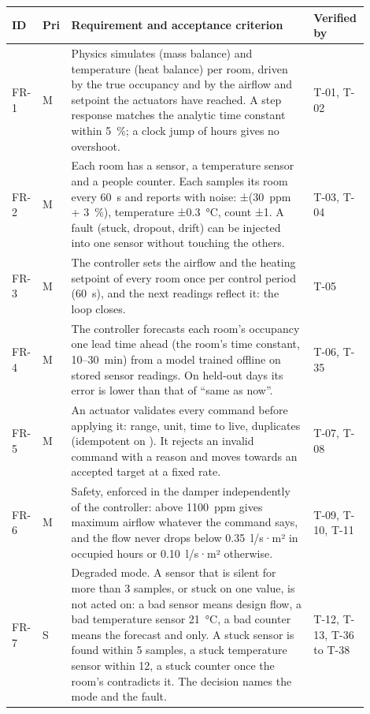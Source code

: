 \begin{longtable}[]{@{}L{0.07\linewidth}L{0.04\linewidth}L{0.66\linewidth}L{0.13\linewidth}@{}}
\toprule
\textbf{ID} & \textbf{Pri} & \textbf{Requirement and acceptance criterion} & \textbf{Verified by} \\
\midrule
\endhead
FR-1 & M & Physics simulates \COtwo{} (mass balance) and temperature (heat
balance) per room, driven by the true occupancy and by the airflow and setpoint
the actuators have reached. A step response matches the analytic time constant
within 5~\%; a clock jump of hours gives no overshoot. & T-01, T-02 \\
FR-2 & M & Each room has a \COtwo{} sensor, a temperature sensor and a people
counter. Each samples its room every 60~s and reports with noise: \COtwo{}
±(30~ppm + 3~\%), temperature ±0.3~°C, count ±1. A fault (stuck, dropout,
drift) can be injected into one sensor without touching the others. & T-03, T-04 \\
FR-3 & M & The controller sets the airflow and the heating setpoint of every
room once per control period (60~s), and the next readings reflect it: the loop
closes. & T-05 \\
FR-4 & M & The controller forecasts each room's occupancy one lead time ahead
(the room's \COtwo{} time constant, 10--30~min) from a model trained offline on
stored sensor readings. On held-out days its error is lower than that of ``same
as now''. & T-06, T-35 \\
FR-5 & M & An actuator validates every command before applying it: range,
unit, time to live, duplicates (idempotent on ). It rejects an
invalid command with a reason and moves towards an accepted target at a fixed
rate. & T-07, T-08 \\
FR-6 & M & Safety, enforced in the damper independently of the controller:
\COtwo{} above 1100~ppm gives maximum airflow whatever the command says, and
the flow never drops below 0.35~l/s·m² in occupied hours or 0.10~l/s·m²
otherwise. & T-09, T-10, T-11 \\
FR-7 & S & Degraded mode. A sensor that is silent for more than 3 samples, or
stuck on one value, is not acted on: a bad \COtwo{} sensor means design flow, a
bad temperature sensor 21~°C, a bad counter means the forecast and \COtwo{}
only. A stuck \COtwo{} sensor is found within 5 samples, a stuck temperature
sensor within 12, a stuck counter once the room's \COtwo{} contradicts it. The
decision names the mode and the fault. & T-12, T-13, T-36 to T-38 \\

\end{longtable}
